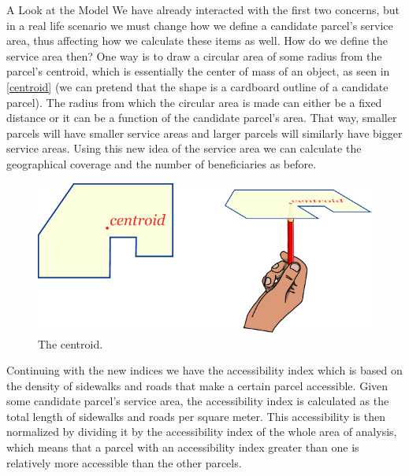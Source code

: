 \documentclass[12pt]{pom_thesis}
\theoremstyle{definition}
\begin{document}
\begin{chapter}{A Look at the Model}
We have already interacted with the first two concerns, but in a real life scenario we must change how we define a candidate parcel's service area, thus affecting how we calculate these items as well. How do we define the service area then? One way is to draw a circular area of some radius from the parcel's centroid, which is essentially the center of mass of an object, as seen in \autoref{centroid} (we can pretend that the shape is a cardboard outline of a candidate parcel). The radius from which the circular area is made can either be a fixed distance or it can be a function of the candidate parcel's area. That way, smaller parcels will have smaller service areas and larger parcels will similarly have bigger service areas. Using this new idea of the service area we can calculate the geographical coverage and the number of beneficiaries as before. 

\begin{figure}
\centering
\includegraphics{centroid}
\caption[The centroid.]{The centroid. \footnotemark}
\label{centroid}
\end{figure}

Continuing with the new indices we have the accessibility index which is based on the density of sidewalks and roads that make a certain parcel accessible. Given some candidate parcel's service area, the accessibility index is calculated as the total length of sidewalks and roads per square meter. This accessibility is then normalized by dividing it by the accessibility index of the whole area of analysis, which means that a parcel with an accessibility index greater than one is relatively more accessible than the other parcels. 


\end{chapter}
\end{document}
